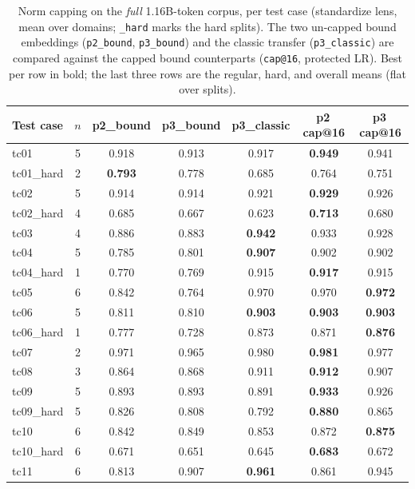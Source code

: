 \documentclass[a4paper,oneside,bibliography=totoc]{scrbook}
\begin{document}
\begin{table}[t]
\centering
\small
\caption{Norm capping on the \emph{full} 1.16B-token corpus, per test case
(standardize lens, mean over domains; \texttt{\_hard} marks the hard splits).
The two un-capped bound embeddings (\texttt{p2\_bound}, \texttt{p3\_bound}) and
the classic transfer (\texttt{p3\_classic}) are compared against the capped bound
counterparts (\texttt{cap@16}, protected LR). Best per row in bold; the last three
rows are the regular, hard, and overall means (flat over splits).}
\label{tab:dbpedia_cap_p3}
\setlength{\tabcolsep}{4pt}
\begin{tabular}{lcccccc}
\toprule
\textbf{Test case} & $n$ & \textbf{p2\_bound} & \textbf{p3\_bound} & \textbf{p3\_classic}
& \textbf{p2\,cap@16} & \textbf{p3\,cap@16} \\
\midrule
tc01 & 5 & 0.918 & 0.913 & 0.917 & \textbf{0.949} & 0.941 \\
tc01\_hard & 2 & \textbf{0.793} & 0.778 & 0.685 & 0.764 & 0.751 \\
tc02 & 5 & 0.914 & 0.914 & 0.921 & \textbf{0.929} & 0.926 \\
tc02\_hard & 4 & 0.685 & 0.667 & 0.623 & \textbf{0.713} & 0.680 \\
tc03 & 4 & 0.886 & 0.883 & \textbf{0.942} & 0.933 & 0.928 \\
tc04 & 5 & 0.785 & 0.801 & \textbf{0.907} & 0.902 & 0.902 \\
tc04\_hard & 1 & 0.770 & 0.769 & 0.915 & \textbf{0.917} & 0.915 \\
tc05 & 6 & 0.842 & 0.764 & 0.970 & 0.970 & \textbf{0.972} \\
tc06 & 5 & 0.811 & 0.810 & \textbf{0.903} & \textbf{0.903} & \textbf{0.903} \\
tc06\_hard & 1 & 0.777 & 0.728 & 0.873 & 0.871 & \textbf{0.876} \\
tc07 & 2 & 0.971 & 0.965 & 0.980 & \textbf{0.981} & 0.977 \\
tc08 & 3 & 0.864 & 0.868 & 0.911 & \textbf{0.912} & 0.907 \\
tc09 & 5 & 0.893 & 0.893 & 0.891 & \textbf{0.933} & 0.926 \\
tc09\_hard & 5 & 0.826 & 0.808 & 0.792 & \textbf{0.880} & 0.865 \\
tc10 & 6 & 0.842 & 0.849 & 0.853 & 0.872 & \textbf{0.875} \\
tc10\_hard & 6 & 0.671 & 0.651 & 0.645 & \textbf{0.683} & 0.672 \\
tc11 & 6 & 0.813 & 0.907 & \textbf{0.961} & 0.861 & 0.945 \\

\end{tabular}
\end{table}
\end{document}
